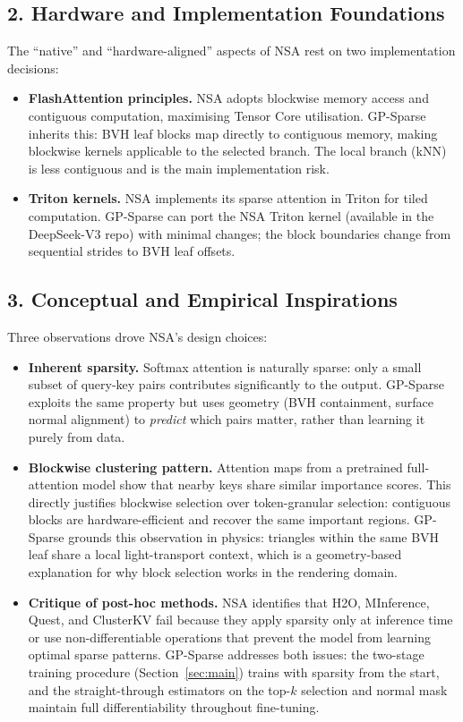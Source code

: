 \documentclass[11pt,letterpaper]{article}
\begin{document}
\subsection*{2. Hardware and Implementation Foundations}

The ``native'' and ``hardware-aligned'' aspects of NSA rest on two
implementation decisions:

\begin{itemize}[nosep]
  \item \textbf{FlashAttention principles.} NSA adopts blockwise memory
    access and contiguous computation, maximising Tensor Core utilisation.
    GP-Sparse inherits this: BVH leaf blocks map directly to contiguous
    memory, making blockwise kernels applicable to the selected branch.
    The local branch (kNN) is less contiguous and is the main
    implementation risk.
  \item \textbf{Triton kernels.} NSA implements its sparse attention
    in Triton for tiled computation.
    GP-Sparse can port the NSA Triton kernel (available in the
    DeepSeek-V3 repo) with minimal changes; the block boundaries change
    from sequential strides to BVH leaf offsets.
\end{itemize}

\subsection*{3. Conceptual and Empirical Inspirations}

Three observations drove NSA's design choices:

\begin{itemize}[nosep]
  \item \textbf{Inherent sparsity.} Softmax attention is naturally sparse:
    only a small subset of query-key pairs contributes significantly to
    the output.
    GP-Sparse exploits the same property but uses geometry (BVH
    containment, surface normal alignment) to \emph{predict} which pairs
    matter, rather than learning it purely from data.
  \item \textbf{Blockwise clustering pattern.} Attention maps from a
    pretrained full-attention model show that nearby keys share similar
    importance scores.
    This directly justifies blockwise selection over token-granular
    selection: contiguous blocks are hardware-efficient and recover the
    same important regions.
    GP-Sparse grounds this observation in physics: triangles within the
    same BVH leaf share a local light-transport context, which is a
    geometry-based explanation for why block selection works in the
    rendering domain.
  \item \textbf{Critique of post-hoc methods.} NSA identifies that H2O,
    MInference, Quest, and ClusterKV fail because they apply sparsity
    only at inference time or use non-differentiable operations that
    prevent the model from learning optimal sparse patterns.
    GP-Sparse addresses both issues: the two-stage training procedure
    (Section~\ref{sec:main}) trains with sparsity from the start, and the
    straight-through estimators on the top-$k$ selection and normal mask
    maintain full differentiability throughout fine-tuning.
\end{itemize}
\end{document}
